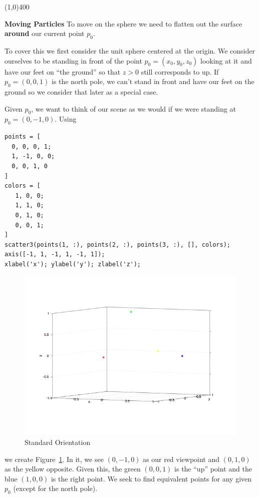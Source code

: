 \documentclass[a4paper,10pt]{article}
\begin{document}
\begin{center}
\line(1,0){400}
\end{center}

\textbf{Moving Particles} To move on the sphere we need to flatten out the
surface \textbf{around} our current point \(p_0\).

To cover this we first consider the unit sphere centered at the origin.
We consider ourselves to be standing in front of the point \(p_0 = (x_0,
y_0, z_0)\) looking at it and have our feet on ``the ground'' so that
\(z > 0\) still corresponds to up. If \(p_0 = (0, 0, 1)\) is the north pole,
we can't stand in front and have our feet on the ground so we consider that
later as a special case.

Given \(p_0\), we want to think of our scene as we would if we were
standing at \(p_0 = (0, -1, 0)\). Using
\begin{verbatim}
points = [
  0, 0, 0, 1;
  1, -1, 0, 0;
  0, 0, 1, 0
]
colors = [
   1, 0, 0;
   1, 1, 0;
   0, 1, 0;
   0, 0, 1;
]
scatter3(points(1, :), points(2, :), points(3, :), [], colors);
axis([-1, 1, -1, 1, -1, 1]);
xlabel('x'); ylabel('y'); zlabel('z');
\end{verbatim}
\begin{figure}
  \centering
    \includegraphics[scale=0.5]{standard_orientation.png}
  \caption{Standard Orientation}
  \label{fig:1f}
\end{figure}
we create Figure~\ref{fig:1f}. In it, we see \((0, -1, 0)\) as our red
viewpoint and \((0, 1, 0)\) as the yellow opposite. Given this, the green
\((0, 0, 1)\) is the ``up'' point and the blue \((1, 0, 0)\) is the right
point. We seek to find equivalent points for any given \(p_0\) (except for
the north pole).
\end{document}
